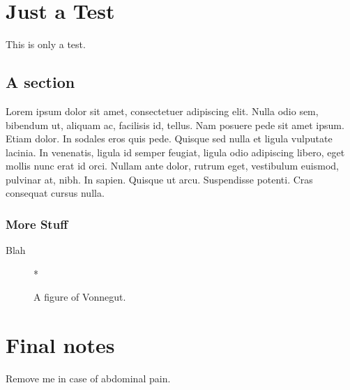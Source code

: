 \documentclass[12pt,chapterheads]{ucsd}
\begin{document}
%







%   
%   
%
\chapter{Just a Test}
This is only a test.
\section{A section}
Lorem ipsum dolor sit amet, consectetuer adipiscing elit. Nulla odio
sem, bibendum ut, aliquam ac, facilisis id, tellus. Nam posuere pede
sit amet ipsum. Etiam dolor. In sodales eros quis pede.  Quisque sed
nulla et ligula vulputate lacinia. In venenatis, ligula id semper
feugiat, ligula odio adipiscing libero, eget mollis nunc erat id orci.
Nullam ante dolor, rutrum eget, vestibulum euismod, pulvinar at, nibh.
In sapien. Quisque ut arcu. Suspendisse potenti. Cras consequat cursus
nulla.
\subsection{More Stuff}
Blah

\begin{figure}[h] 
  \centering
  *
  \caption{A figure of Vonnegut.} 
\end{figure}



\appendix
\chapter{Final notes}
  Remove me in case of abdominal pain.





\end{document}
